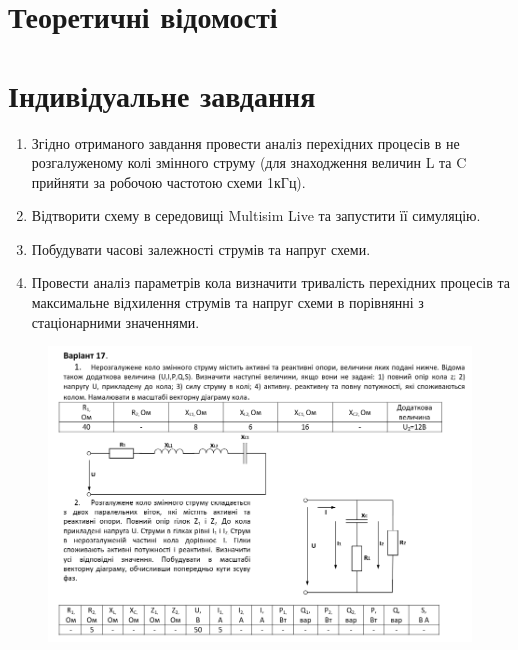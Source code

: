\documentclass{article}
\begin{document}
\begin{normalsize}
	\section*{Теоретичні відомості}

	
		\section*{Індивідуальне завдання}
	\begin{enumerate}
		\item Згідно отриманого завдання провести аналіз перехідних процесів в не
		розгалуженому колі змінного струму (для знаходження величин L та C
		прийняти за робочою частотою схеми 1кГц).
		\item Відтворити схему в середовищі Multisim Live та запустити її симуляцію.
		\item Побудувати часові залежності струмів та напруг схеми.
		\item Провести аналіз параметрів кола визначити тривалість перехідних
		процесів та максимальне відхилення струмів та напруг схеми в порівнянні
		з стаціонарними значеннями.
	\end{enumerate}
	
	\begin{figure}[H]
		\centering
		\includegraphics[scale=0.5]{v}
	\end{figure}
	

\end{normalsize}
\end{document}
